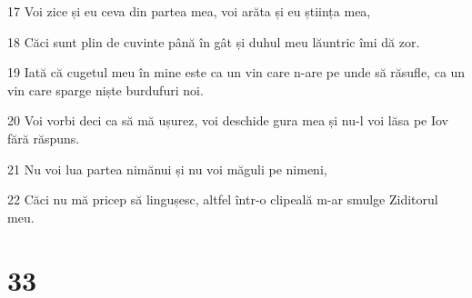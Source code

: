 \par 17 Voi zice și eu ceva din partea mea, voi arăta și eu știința mea,
\par 18 Căci sunt plin de cuvinte până în gât și duhul meu lăuntric îmi dă zor.
\par 19 Iată că cugetul meu în mine este ca un vin care n-are pe unde să răsufle, ca un vin care sparge niște burdufuri noi.
\par 20 Voi vorbi deci ca să mă ușurez, voi deschide gura mea și nu-l voi lăsa pe Iov fără răspuns.
\par 21 Nu voi lua partea nimănui și nu voi măguli pe nimeni,
\par 22 Căci nu mă pricep să lingușesc, altfel într-o clipeală m-ar smulge Ziditorul meu.

\chapter{33}

